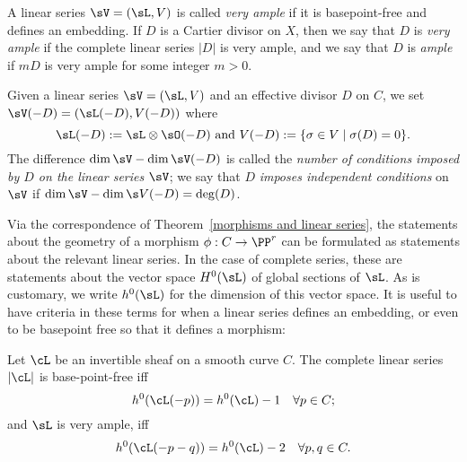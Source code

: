 A linear series $\sV = (\sL, V)$ is called  \emph{very ample}  if it is basepoint-free and defines an embedding. If $D$ is a Cartier divisor on $X$, then we say that $D$ is \emph{very ample} if the complete linear series $|D|$ is very ample, and we say that $D$ is \emph{ample} if $mD$ is very ample for some integer $m>0$.

Given a linear series $\sV = (\sL, V)$ and an effective divisor $D$ on $C$, we  set
$
\sV(-D) = (\sL(-D),V(-D))
$
where
$$
\sL(-D): = \sL \otimes \sO(-D)\hbox{ and } V(-D) := \{ \sigma \in V \mid \sigma(D) = 0 \}.
$$
The difference $\dim \sV - \dim \sV(-D)$ is called the \emph{number of conditions imposed by $D$ on the linear series $\sV$}; we say that $D$ \emph{imposes independent conditions} on $\sV$ if $\dim \sV - \dim \s V(-D) = \deg(D)$.

Via the correspondence of Theorem~\ref{morphisms and linear series}, the statements about the geometry of a morphism $\phi : C \to \PP^r$ can be formulated as statements about the relevant linear series. In the case of complete series, these are statements about the vector space $H^{0}(\sL)$ of global sections of $\sL$. As is customary, we write $h^{0}(\sL)$ for the dimension of this vector space. It is useful to have criteria
in these terms for when a linear series defines an embedding, or even to be basepoint free so that it
defines a morphism:

\begin{proposition}\label{very ample}\cite[Thm. IV.3.1]{H}
Let $\cL$ be an invertible sheaf on a smooth curve $C$. The complete linear series $|\cL|$ is base-point-free iff
$$
h^0(\cL(-p)) = h^0(\cL) - 1 \quad \forall p \in C;
$$
and $\sL$ is very ample, iff
$$
h^0(\cL(-p-q)) = h^0(\cL) - 2 \quad \forall p, q \in C.
$$
\end{proposition} 

